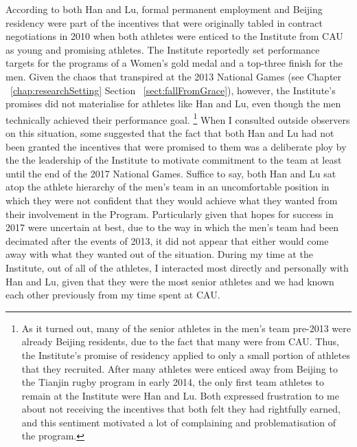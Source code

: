 \begin{CJK}{UTF8}{gbsn}
According to both Han and Lu, formal permanent employment and Beijing residency were part of the incentives that were originally tabled in contract negotiations in 2010 when both athletes were enticed to the Institute from CAU as young and promising athletes.  The Institute reportedly set performance targets for the programs of a Women's gold medal and a top-three finish for the men.  Given the chaos that transpired at the 2013 National Games (see Chapter ~\ref{chap:researchSetting} Section ~\ref{sect:fallFromGrace}), however, the Institute's promises did not materialise for athletes like Han and Lu, even though the men technically achieved their performance goal.
    \footnote{As it turned out, many of the senior athletes in the men's team pre-2013 were already Beijing residents, due to the fact that many were from CAU.  Thus, the Institute's promise of residency applied to only a small portion of athletes that they recruited.  After many athletes were enticed away from Beijing to the Tianjin rugby program in early 2014, the only first team athletes to remain at the Institute were Han and Lu.  Both expressed frustration to me about not receiving the incentives that both felt they had rightfully earned, and this sentiment motivated a lot of complaining and problematisation of the program.}
When I consulted outside observers on this situation, some suggested that the fact that both Han and Lu had not been granted the incentives that were promised to them was a deliberate ploy by the the leadership of the Institute to motivate commitment to the team at least until the end of the 2017 National Games.  Suffice to say, both Han and Lu sat atop the athlete hierarchy of the men's team in an uncomfortable position in which they were not confident that they would achieve what they wanted from their involvement in the Program.  Particularly given that hopes for success in 2017 were uncertain at best, due to the way in which the men's team had been decimated after the events of 2013, it did not appear that either would come away with what they wanted out of the situation.  During my time at the Institute, out of all of the athletes, I interacted most directly and personally with Han and Lu, given that they were the most senior athletes and we had known each other previously from my time spent at CAU.


\end{CJK}
